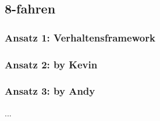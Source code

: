 \subsection{8-fahren}
\label{8-fahren}

\subsubsection{Ansatz 1: Verhaltensframework}

\subsubsection{Ansatz 2: by Kevin}

\subsubsection{Ansatz 3: by Andy}
...
